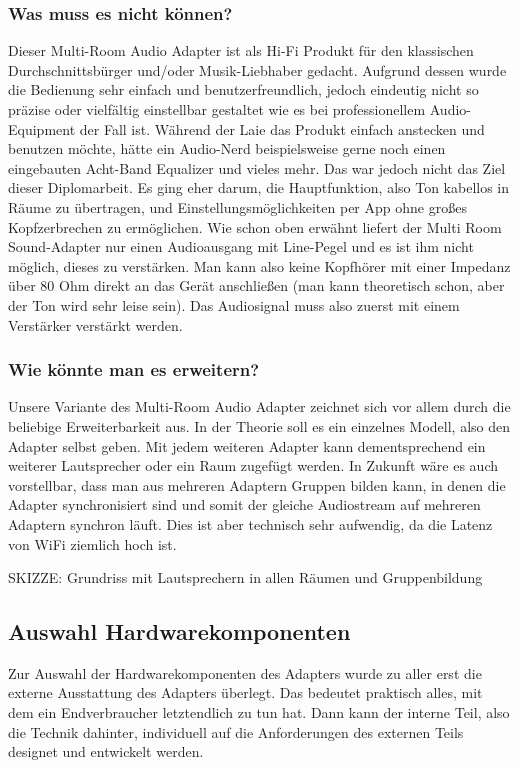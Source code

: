 \documentclass[11pt, twoside]{article}
\begin{document}
\subsubsection{Was muss es nicht können?}
Dieser Multi-Room Audio Adapter ist als Hi-Fi Produkt für den klassischen Durchschnittsbürger und/oder Musik-Liebhaber gedacht. Aufgrund dessen wurde die Bedienung sehr einfach und benutzerfreundlich, jedoch eindeutig nicht so präzise oder vielfältig einstellbar gestaltet wie es bei professionellem Audio-Equipment der Fall ist. Während der Laie das Produkt einfach anstecken und benutzen möchte, hätte ein Audio-Nerd beispielsweise gerne noch einen eingebauten Acht-Band Equalizer und vieles mehr. Das war jedoch nicht das Ziel dieser Diplomarbeit. Es ging eher darum, die Hauptfunktion, also Ton kabellos in Räume zu übertragen, und Einstellungsmöglichkeiten per App ohne großes Kopfzerbrechen zu ermöglichen.\newline
Wie schon oben erwähnt liefert der Multi Room Sound-Adapter nur einen Audioausgang mit Line-Pegel und es ist ihm nicht möglich, dieses zu verstärken. Man kann also keine Kopfhörer mit einer Impedanz über 80 Ohm direkt an das Gerät anschließen (man kann theoretisch schon, aber der Ton wird sehr leise sein). Das Audiosignal muss also zuerst mit einem Verstärker verstärkt werden.\newline
\subsubsection{Wie könnte man es erweitern?}
Unsere Variante des Multi-Room Audio Adapter zeichnet sich vor allem durch die beliebige Erweiterbarkeit aus. In der Theorie soll es ein einzelnes Modell, also den Adapter selbst geben. Mit jedem weiteren Adapter kann dementsprechend ein weiterer Lautsprecher oder ein Raum zugefügt werden. In Zukunft wäre es auch vorstellbar, dass man aus mehreren Adaptern Gruppen bilden kann, in denen die Adapter synchronisiert sind und somit der gleiche Audiostream auf mehreren Adaptern synchron läuft. Dies ist aber technisch sehr aufwendig, da die Latenz von WiFi ziemlich hoch ist.\newline

SKIZZE: Grundriss mit Lautsprechern in allen Räumen und Gruppenbildung
\subsection{Auswahl Hardwarekomponenten}
Zur Auswahl der Hardwarekomponenten des Adapters wurde zu aller erst die externe Ausstattung des Adapters überlegt. Das bedeutet praktisch alles, mit dem ein Endverbraucher letztendlich zu tun hat. Dann kann der interne Teil, also die Technik dahinter, individuell auf die Anforderungen des externen Teils designet und entwickelt werden.
\end{document}
